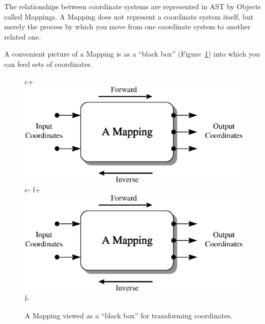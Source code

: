 \documentclass[twoside,11pt]{article}
\newenvironment{latexonly}{}{}
\begin{document}
The relationships between coordinate systems are represented in AST by
Objects called Mappings. A Mapping does not represent a coordinate
system itself, but merely the process by which you move from one
coordinate system to another related one.
 
\begin{latexonly}
   A convenient picture of a Mapping is as a ``black box''
   (Figure~\ref{fig:mapping}) into which you can feed sets of
   coordinates.
   \begin{figure}[bhtp]
   \begin{center}
c+
   \includegraphics[scale=0.7]{sun211_figures/mapping.eps}
c-
f+
   \includegraphics[scale=0.7]{sun210_figures/mapping.eps}
f-
   \caption{A Mapping viewed as a ``black box'' for transforming coordinates.}
   \label{fig:mapping}
   \end{center}
   \end{figure}
\end{latexonly}
\end{document}
